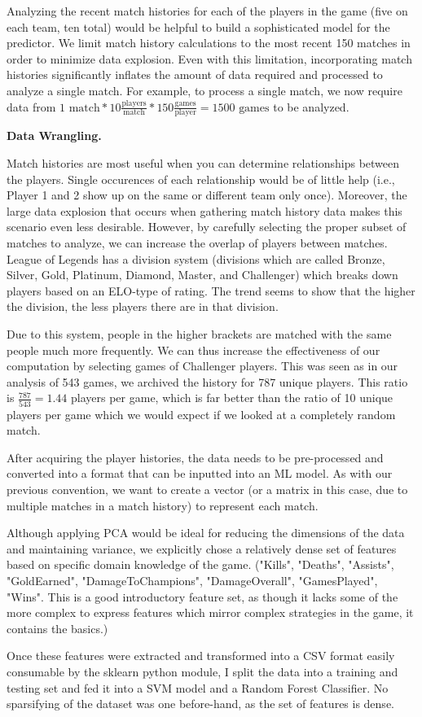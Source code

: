 Analyzing the recent match histories for each of the players in the game 
(five on each team, ten total) would be helpful to build a sophisticated model for the predictor.  
We limit match history calculations to the most recent 150 matches in order to 
minimize data explosion.  Even with this 
limitation, incorporating match histories significantly inflates the amount of 
data required and processed to analyze a single match.  
For example, to process a single match, we now require data from $1 \mbox{ match} * 10 \frac{\mbox{players}}{\mbox{match}} * 150 \frac{\mbox{games}}{\mbox{player}} = 1500 \mbox{ games}$ to be analyzed. 

\textbf{Data Wrangling. }

Match histories are most useful when you can determine relationships between the players. 
Single occurences of each relationship would be of little help (i.e., Player 1 and 2 show up on the same or different team only once).
Moreover, the large data explosion that occurs when gathering match history data makes this scenario even less desirable.  However, by carefully selecting the proper subset of matches to analyze, we can increase the overlap of players between matches. League of Legends has a division system (divisions which are called Bronze, Silver, Gold, Platinum, Diamond, Master, and Challenger) which breaks down players based on an ELO-type of rating. The trend seems to show that the higher the division, the less players there are in that division. 


Due to this system, people in the higher brackets are matched with the same people much more frequently. We can thus increase the effectiveness of our computation by selecting games of Challenger players. This was seen as in our analysis of 543 games, we archived the history for 787 unique players. This ratio is $\frac{787}{543} = 1.44$ players per game, which is far better than the ratio of 10 unique players per game which we would expect if we looked at a completely random match. 

After acquiring the player histories, the data needs to be pre-processed and converted into a format that can be inputted into an ML model.  As with our previous convention, we want to create a vector (or a matrix in this case, due to multiple matches in a match history) to represent each match. 

Although applying PCA would be ideal for reducing the dimensions of the data and maintaining variance, we explicitly chose a relatively dense set of features based on 
specific domain knowledge of the game.  ("Kills", "Deaths", "Assists", "GoldEarned", "DamageToChampions", "DamageOverall", "GamesPlayed", "Wins". This is a good introductory feature set, as though it lacks some of the more complex to express features which mirror complex strategies in the game, it contains the basics.) 

Once these features were extracted and transformed into a CSV format easily consumable by the sklearn python module, I split the data into a training and testing set and fed it into a SVM model and a Random Forest Classifier. No sparsifying of the dataset was one before-hand, as the set of features is dense. 